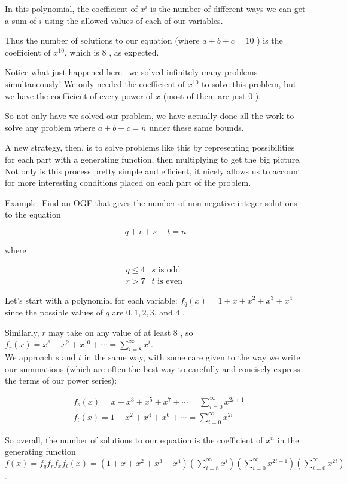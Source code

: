 \documentclass{article}
\begin{document}
In this polynomial, the coefficient of $x^{i}$ is the number of different ways we can get a sum of $i$ using the allowed values of each of our variables.

Thus the number of solutions to our equation (where $a+b+c=10$ ) is the coefficient of $x^{10}$, which is 8 , as expected.

Notice what just happened here-- we solved infinitely many problems simultaneously! We only needed the coefficient of $x^{10}$ to solve this problem, but we have the coefficient of every power of $x$ (most of them are just 0 ).

So not only have we solved our problem, we have actually done all the work to solve any problem where $a+b+c=n$ under these same bounds.

A new strategy, then, is to solve problems like this by representing possibilities for each part with a generating function, then multiplying to get the big picture. Not only is this process pretty simple and efficient, it nicely allows us to account for more interesting conditions placed on each part of the problem.

Example: Find an OGF that gives the number of non-negative integer solutions to the equation

$$
q+r+s+t=n
$$

where

$$
\begin{array}{rr}
q \leq 4 & s \text { is odd } \\
r>7 & t \text { is even }
\end{array}
$$

Let's start with a polynomial for each variable: $f_{q}(x)=1+x+x^{2}+x^{3}+x^{4}$ since the possible values of $q$ are $0,1,2,3$, and 4 .

Similarly, $r$ may take on any value of at least 8 , so $f_{r}(x)=x^{8}+x^{9}+x^{10}+\cdots=\sum_{i=8}^{\infty} x^{i}$.\\
We approach $s$ and $t$ in the same way, with some care given to the way we write our summations (which are often the best way to carefully and concisely express the terms of our power series):

$$
\begin{aligned}
& f_{s}(x)=x+x^{3}+x^{5}+x^{7}+\cdots=\sum_{i=0}^{\infty} x^{2 i+1} \\
& f_{t}(x)=1+x^{2}+x^{4}+x^{6}+\cdots=\sum_{i=0}^{\infty} x^{2 i}
\end{aligned}
$$

So overall, the number of solutions to our equation is the coefficient of $x^{n}$ in the generating function\\
$f(x)=f_{q} f_{r} f_{x} f_{t}(x)=\left(1+x+x^{2}+x^{3}+x^{4}\right)\left(\sum_{i=8}^{\infty} x^{i}\right)\left(\sum_{i=0}^{\infty} x^{2 i+1}\right)\left(\sum_{i=0}^{\infty} x^{2 i}\right)$.
\end{document}
